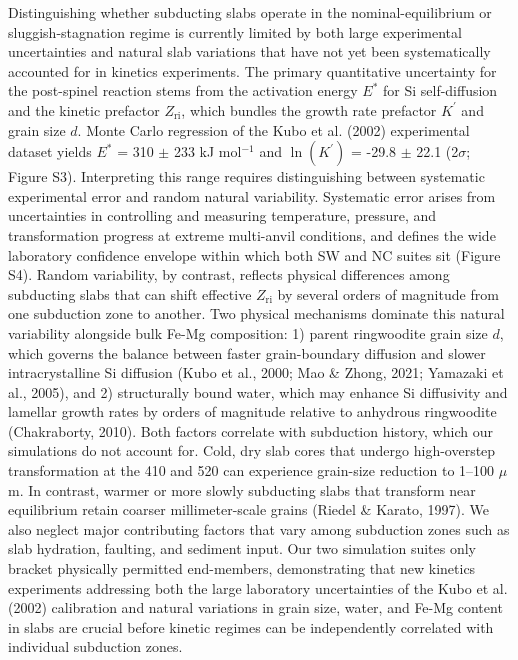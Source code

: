 \documentclass[draft,linenumbers]{agujournal2019}
\begin{document}
Distinguishing whether subducting slabs operate in the
nominal-equilibrium or sluggish-stagnation regime is currently limited
by both large experimental uncertainties and natural slab variations
that have not yet been systematically accounted for in kinetics
experiments. The primary quantitative uncertainty for the post-spinel
reaction stems from the activation energy \(E^{\ast}\) for Si
self-diffusion and the kinetic prefactor \(Z_\mathrm{ri}\), which
bundles the growth rate prefactor \(K^{\prime}\) and grain size \(d\).
Monte Carlo regression of the Kubo et al. (2002) experimental dataset
yields \(E^{\ast}\) = 310 \(\pm\) 233 kJ mol\(^{-1}\) and
\(\ln(K^{\prime})\) = -29.8 \(\pm\) 22.1 (2\(\sigma\); Figure S3).
Interpreting this range requires distinguishing between systematic
experimental error and random natural variability. Systematic error
arises from uncertainties in controlling and measuring temperature,
pressure, and transformation progress at extreme multi-anvil conditions,
and defines the wide laboratory confidence envelope within which both SW
and NC suites sit (Figure S4). Random variability, by contrast, reflects
physical differences among subducting slabs that can shift effective
\(Z_\mathrm{ri}\) by several orders of magnitude from one subduction
zone to another. Two physical mechanisms dominate this natural
variability alongside bulk Fe-Mg composition: 1) parent ringwoodite
grain size \(d\), which governs the balance between faster
grain-boundary diffusion and slower intracrystalline Si diffusion (Kubo
et al., 2000; Mao \& Zhong, 2021; Yamazaki et al., 2005), and 2)
structurally bound water, which may enhance Si diffusivity and lamellar
growth rates by orders of magnitude relative to anhydrous ringwoodite
(Chakraborty, 2010). Both factors correlate with subduction history,
which our simulations do not account for. Cold, dry slab cores that
undergo high-overstep transformation at the 410 and 520 can experience
grain-size reduction to 1--100 \(\mu\)m. In contrast, warmer or more
slowly subducting slabs that transform near equilibrium retain coarser
millimeter-scale grains (Riedel \& Karato, 1997). We also neglect major
contributing factors that vary among subduction zones such as slab
hydration, faulting, and sediment input. Our two simulation suites only
bracket physically permitted end-members, demonstrating that new
kinetics experiments addressing both the large laboratory uncertainties
of the Kubo et al. (2002) calibration and natural variations in grain
size, water, and Fe-Mg content in slabs are crucial before kinetic
regimes can be independently correlated with individual subduction
zones.
\end{document}
